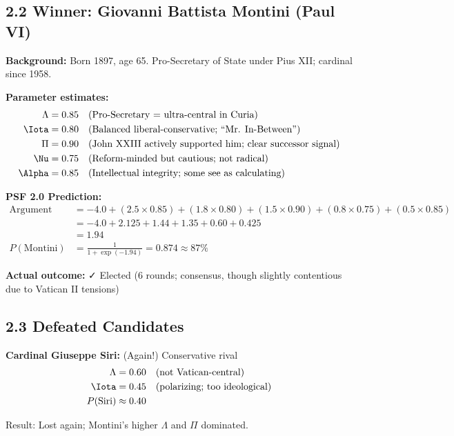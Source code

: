\documentclass[11pt]{article}
\begin{document}
\subsection{2.2 Winner: Giovanni Battista Montini (Paul VI)}

\textbf{Background:} Born 1897, age 65. Pro-Secretary of State under Pius XII; cardinal since 1958.

\textbf{Parameter estimates:}
\begin{align*}
\Lambda &= 0.85 \quad \text{(Pro-Secretary = ultra-central in Curia)} \\
\Iota &= 0.80 \quad \text{(Balanced liberal-conservative; ``Mr. In-Between'')} \\
\Pi &= 0.90 \quad \text{(John XXIII actively supported him; clear successor signal)} \\
\Nu &= 0.75 \quad \text{(Reform-minded but cautious; not radical)} \\
\Alpha &= 0.85 \quad \text{(Intellectual integrity; some see as calculating)}
\end{align*}

\textbf{PSF 2.0 Prediction:}
\begin{align*}
\text{Argument} &= -4.0 + (2.5 \times 0.85) + (1.8 \times 0.80) + (1.5 \times 0.90) + (0.8 \times 0.75) + (0.5 \times 0.85) \\
&= -4.0 + 2.125 + 1.44 + 1.35 + 0.60 + 0.425 \\
&= 1.94 \\
P(\text{Montini}) &= \frac{1}{1 + \exp(-1.94)} = 0.874 \approx 87\%
\end{align*}

\textbf{Actual outcome:} ✓ Elected (6 rounds; consensus, though slightly contentious due to Vatican II tensions)

\subsection{2.3 Defeated Candidates}

\textbf{Cardinal Giuseppe Siri:} (Again!) Conservative rival
\begin{align*}
\Lambda &= 0.60 \quad \text{(not Vatican-central)} \\
\Iota &= 0.45 \quad \text{(polarizing; too ideological)} \\
P(\text{Siri}) &\approx 0.40
\end{align*}

Result: Lost again; Montini's higher $\Lambda$ and $\Pi$ dominated.
\end{document}

